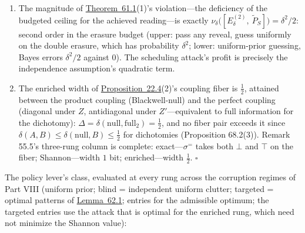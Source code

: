 \begin{thmplain}

\par\nopagebreak

\begin{enumerate}
\def\labelenumi{\arabic{enumi}.}
\tightlist
\item
  The magnitude of \hyperlink{stmt:61.1}{Theorem~61.1}(1)'s violation---\hspace{0pt}the deficiency of the budgeted ceiling for the achieved reading---\hspace{0pt}is exactly \(\nu_\delta\big([E_\delta^{(2)},\ \widetilde{P}_S]\big) = \delta^2/2\): second order in the erasure budget (upper: pass any reveal, guess uniformly on the double erasure, which has probability \(\delta^2\); lower: uniform-prior guessing, Bayes errors \(\delta^2/2\) against \(0\)). The scheduling attack's profit is precisely the independence assumption's quadratic term.
\item
  The enriched width of \hyperlink{stmt:22.4}{Proposition~22.4}(2)'s coupling fiber is \(\tfrac12\), attained between the product coupling (Blackwell-null) and the perfect coupling (diagonal under \(Z\), antidiagonal under \(Z'\)---\hspace{0pt}equivalent to full information for the dichotomy): \(\Delta = \delta(\text{null}, \text{full}_2) = \tfrac12\), and no fiber pair exceeds it since \(\delta(A, B) \le \delta(\text{null}, B) \le \tfrac12\) for dichotomies (Proposition 68.2(3)). Remark 55.5's three-rung column is complete: exact---\hspace{0pt}\(\sigma^{=}\) takes both \(\bot\) and \(\top\) on the fiber; Shannon---\hspace{0pt}width \(1\) bit; enriched---\hspace{0pt}width \(\tfrac12\). \(\square\)
\end{enumerate}
\end{thmplain}


The policy lever's class, evaluated at every rung across the corruption regimes of Part VIII (uniform prior; blind = independent uniform clutter; targeted = optimal patterns of \hyperlink{stmt:62.1}{Lemma~62.1}; entries for the admissible optimum; the targeted entries use the attack that is optimal for the enriched rung, which need not minimize the Shannon value):

